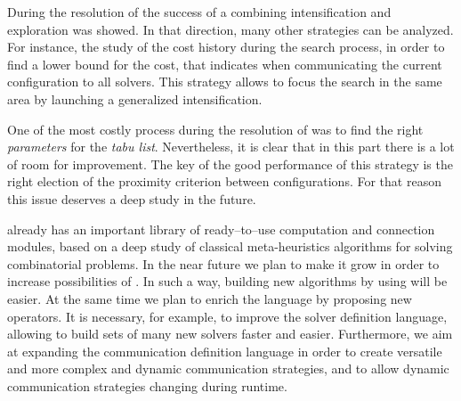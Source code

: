 During the resolution of \sgp{} the success of a \comstr{} combining intensification and exploration was showed. In that direction, many other strategies can be analyzed. For instance, the study of the cost history during the search process, in order to find a lower bound for the cost, that indicates when communicating the current configuration to all solvers. This strategy allows to focus the search in the same area by launching a generalized intensification.


One of the most costly process during the resolution of \grp{} was to find the right {\it parameters} for the \textit{tabu list}.  Nevertheless, it is clear that in this part there is a lot of room for improvement. The key of the good performance of this strategy is the right election of the proximity criterion between configurations. For that reason this issue deserves a deep study in the future.

\posl{} already has an important library of ready--to--use computation and connection modules, based on a deep study of classical meta-heuristics algorithms for solving combinatorial problems. In the near future we plan to make it grow in order to increase possibilities of \posl{}. In such a way, building new algorithms by using \posl{} will be easier. At the same time we plan to enrich the language by proposing new operators. It is necessary, for example, to improve the solver definition language, allowing to build sets of many new solvers faster and easier. Furthermore, we aim at expanding the communication definition language in order to create versatile and more complex and dynamic communication strategies, and to allow dynamic communication strategies changing during runtime.

